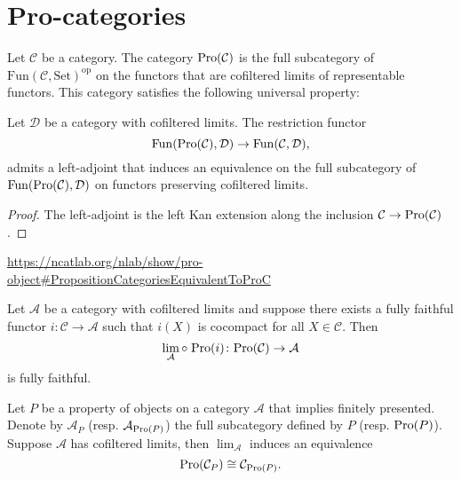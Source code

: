 \chapter{Pro-categories}

Let $\mathcal{C}$ be a category. The category $\mathrm{Pro}(\mathcal{C})$ is the full subcategory of
$\mathrm{Fun}(\mathcal{C}, \mathrm{Set})^{\mathrm{op}}$ on the functors that are cofiltered limits
of representable functors. This category satisfies the following universal property:

\begin{proposition}
    Let $\mathcal{D}$ be a category with cofiltered limits. The restriction functor
    \[
        \mathrm{Fun}(\mathrm{Pro}(\mathcal{C}), \mathcal{D}) \to \mathrm{Fun}(\mathcal{C}, \mathcal{D})
    ,\] admits a left-adjoint that induces an equivalence
    on the full subcategory of $\mathrm{Fun}(\mathrm{Pro}(\mathcal{C}), \mathcal{D})$ on functors preserving
    cofiltered limits.
    \label{prop:pro-univ-prop}
\end{proposition}

\begin{proof}
    The left-adjoint is the left Kan extension along the inclusion $\mathcal{C} \to \mathrm{Pro}(\mathcal{C})$.
\end{proof}

\url{https://ncatlab.org/nlab/show/pro-object#PropositionCategoriesEquivalentToProC}

\begin{proposition}
    Let $\mathcal{A}$ be a category with cofiltered limits and suppose there exists
    a fully faithful functor $i\colon \mathcal{C} \to \mathcal{A}$ such that
    $i(X)$ is cocompact for all $X \in \mathcal{C}$. Then
    \[
        \lim_{\mathcal{A}} \circ \; \mathrm{Pro}(i)\colon \mathrm{Pro}(\mathcal{C}) \to \mathcal{A}
    \] is fully faithful.
    \label{prop:pro-equiv-pro}
\end{proposition}

\begin{corollary}
    Let $P$ be a property of objects on a category $\mathcal{A}$ that implies finitely presented.
    Denote by $\mathcal{A}_P$ (resp. $\mathcal{A}_{\mathrm{Pro}(P)}$) the full subcategory defined by $P$
    (resp. $\mathrm{Pro}(P)$). Suppose $\mathcal{A}$ has cofiltered limits, then $\lim_{\mathcal{A}}$
    induces an equivalence
    \[
        \mathrm{Pro}(\mathcal{C}_{P}) \cong \mathcal{C}_{\mathrm{Pro}(P)}
    .\]
    \label{cor:pro-object-prop}
\end{corollary}

